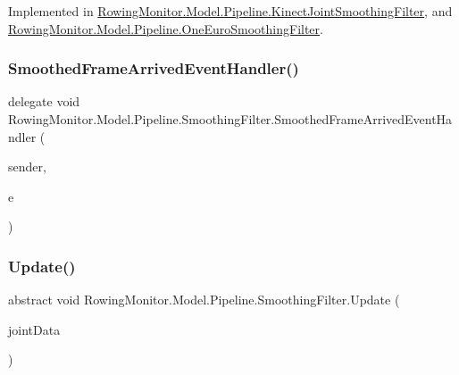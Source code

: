 Implemented in \hyperlink{class_rowing_monitor_1_1_model_1_1_pipeline_1_1_kinect_joint_smoothing_filter_a31ee74610f6c7de082306691f59d2f1c}{Rowing\+Monitor.\+Model.\+Pipeline.\+Kinect\+Joint\+Smoothing\+Filter}, and \hyperlink{class_rowing_monitor_1_1_model_1_1_pipeline_1_1_one_euro_smoothing_filter_afd860237def583deb4499bc3c9fac868}{Rowing\+Monitor.\+Model.\+Pipeline.\+One\+Euro\+Smoothing\+Filter}.

\mbox{\label{class_rowing_monitor_1_1_model_1_1_pipeline_1_1_smoothing_filter_af8a8a5758bd7a174033f698dcb1b93b2}} 
\subsubsection{\texorpdfstring{Smoothed\+Frame\+Arrived\+Event\+Handler()}{SmoothedFrameArrivedEventHandler()}}
{\footnotesize\ttfamily delegate void Rowing\+Monitor.\+Model.\+Pipeline.\+Smoothing\+Filter.\+Smoothed\+Frame\+Arrived\+Event\+Handler (\begin{DoxyParamCaption}\item[{Object}]{sender,  }\item[{\hyperlink{class_rowing_monitor_1_1_model_1_1_smoothed_frame_arrived_event_args}{Smoothed\+Frame\+Arrived\+Event\+Args}}]{e }\end{DoxyParamCaption})}

\mbox{\label{class_rowing_monitor_1_1_model_1_1_pipeline_1_1_smoothing_filter_a6f017782fee0747d4ece9ec3ffea6115}} 
\subsubsection{\texorpdfstring{Update()}{Update()}}
{\footnotesize\ttfamily abstract void Rowing\+Monitor.\+Model.\+Pipeline.\+Smoothing\+Filter.\+Update (\begin{DoxyParamCaption}\item[{\hyperlink{struct_rowing_monitor_1_1_model_1_1_util_1_1_joint_data}{Joint\+Data}}]{joint\+Data }\end{DoxyParamCaption})\hspace{0.3cm}{\ttfamily [pure virtual]}}



